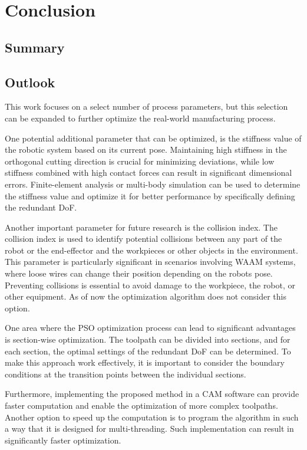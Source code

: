 \chapter{Conclusion}%

\section{Summary}%


\newpage

\section{Outlook}%

This work focuses on a select number of process parameters, but this selection can be expanded to further optimize the real-world manufacturing process.

One potential additional parameter that can be optimized, is the stiffness value of the robotic system based on its current pose. Maintaining high stiffness in the orthogonal cutting direction is crucial for minimizing deviations, while low stiffness combined with high contact forces can result in significant dimensional errors. Finite-element analysis or multi-body simulation can be used to determine the stiffness value and optimize it for better performance by specifically defining the redundant DoF.

Another important parameter for future research is the collision index. The collision index is used to identify potential collisions between any part of the robot or the end-effector and the workpieces or other objects in the environment. This parameter is particularly significant in scenarios involving WAAM systems, where loose wires can change their position depending on the robots pose. Preventing collisions is essential to avoid damage to the workpiece, the robot, or other equipment. As of now the optimization algorithm does not consider this option.

One area where the PSO optimization process can lead to significant advantages is section-wise optimization. The toolpath can be divided into sections, and for each section, the optimal settings of the redundant DoF can be determined. To make this approach work effectively, it is important to consider the boundary conditions at the transition points between the individual sections.

Furthermore, implementing the proposed method in a CAM software can provide faster computation and enable the optimization of more complex toolpaths. Another option to speed up the computation is to program the algorithm in such a way that it is designed for multi-threading. Such implementation can result in significantly faster optimization.  

